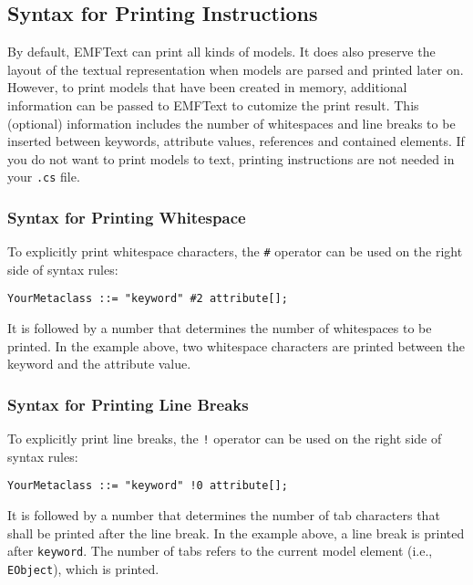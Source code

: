 \subsection{Syntax for Printing Instructions}

By default, EMFText can print all kinds of models. It does also preserve the
layout of the textual representation when models are parsed and printed later
on. However, to print models that have been created in memory, additional
information can be passed to EMFText to cutomize the print result. This
(optional) information includes the number of whitespaces and line breaks to be
inserted between keywords, attribute values, references and contained elements. 
If you do not want to print models to text, printing instructions are not needed 
in your \texttt{.cs} file.

\subsubsection{Syntax for Printing Whitespace}

To explicitly print whitespace characters, the \texttt{\#} operator can be used
on the right side of syntax rules:

\begin{lstlisting}
YourMetaclass ::= "keyword" #2 attribute[];
\end{lstlisting}

It is followed by a number that determines the number of whitespaces to be
printed. In the example above, two whitespace characters are printed between the
keyword and the attribute value.

\subsubsection{Syntax for Printing Line Breaks}

To explicitly print line breaks, the \texttt{!} operator can be used on the
right side of syntax rules:

\begin{lstlisting}
YourMetaclass ::= "keyword" !0 attribute[];
\end{lstlisting}

It is followed by a number that determines the number of tab characters that
shall be printed after the line break. In the example above, a line break
is printed after \texttt{keyword}. The number of tabs refers to the current
model element (i.e., \texttt{EObject}), which is printed.

